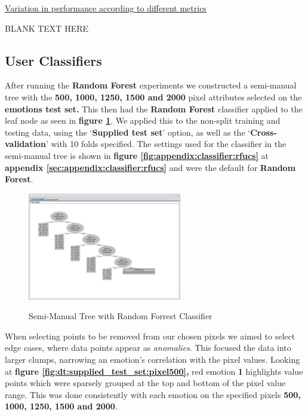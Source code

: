\raggedright\underline{Variation in performance according to different metrics }

BLANK TEXT HERE
\newline










\subsection{User Classifiers}
\label{sec:dt:uc}
After running the \textbf{Random Forest} experiments we constructed a semi-manual tree with the \textbf{500, 1000, 1250, 1500 and 2000} pixel attributes selected on the \textbf{emotions test set.} This then had the \textbf{Random Forest} classifier applied to the leaf node as seen in \textbf{figure \ref{fig:dt:semi_manual_random_forrest}}. We applied this to the non-split training and testing data, using the `\textbf{Supplied test set}' option, as well as the `\textbf{Cross-validation}' with 10 folds specified. The settings used for the classifier in the semi-manual tree is shown in \textbf{figure \ref{fig:appendix:classifier:rfucs}} at \textbf{appendix \ref{sec:appendix:classifier:rfucs}} and were the default for \textbf{Random Forest}.

\begin{figure}[hbt!]
	\centering
      \includegraphics[width=0.6\textwidth]{imgs/userClassifier/noSplit/all/Train-and-Test/tree_settings_with_classifier.png} \\
	\caption{Semi-Manual Tree with Random Forrest Classifier}
	\label{fig:dt:semi_manual_random_forrest}
\end{figure}


When selecting points to be removed from our chosen pixels we aimed to select edge cases, where data points appear as \textit{anomalies}. This focused the data into larger clumps, narrowing an emotion's correlation with the pixel values. Looking at \textbf{figure \ref{fig:dt:supplied_test_set:pixel500},}  red emotion \textbf{1} highlights value points which were sparsely grouped at the top and bottom of the pixel value range. This was done consistently with each emotion on the specified pixels \textbf{500, 1000, 1250, 1500 and 2000}. 

